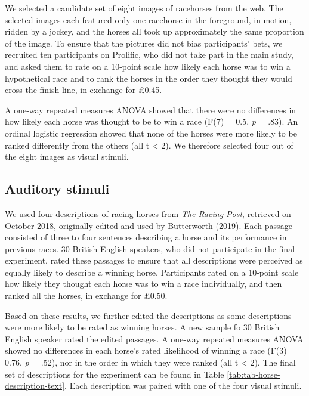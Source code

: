 \documentclass[
  man,floatsintext]{apa7}
\begin{document}
We selected a candidate set of eight images of racehorses from the web. The selected images each featured only one racehorse in the foreground, in motion, ridden by a jockey, and the horses all took up approximately the same proportion of the image. To ensure that the pictures did not bias participants' bets, we recruited ten participants on Prolific, who did not take part in the main study, and asked them to rate on a 10-point scale how likely each horse was to win a hypothetical race and to rank the horses in the order they thought they would cross the finish line, in exchange for £0.45.

A one-way repeated measures ANOVA showed that there were no differences in how likely each horse was thought to be to win a race (F(7) = 0.5, \emph{p} = .83). An ordinal logistic regression showed that none of the horses were more likely to be ranked differently from the others (all \textbar t\textbar{} \textless{} 2). We therefore selected four out of the eight images as visual stimuli.

\hypertarget{auditory-stimuli}{%
\subsection{Auditory stimuli}\label{auditory-stimuli}}

We used four descriptions of racing horses from \emph{The Racing Post}, retrieved on October 2018, originally edited and used by Butterworth (2019). Each passage consisted of three to four sentences describing a horse and its performance in previous races. 30 British English speakers, who did not participate in the final experiment, rated these passages to ensure that all descriptions were perceived as equally likely to describe a winning horse. Participants rated on a 10-point scale how likely they thought each horse was to win a race individually, and then ranked all the horses, in exchange for £0.50.

Based on these results, we further edited the descriptions as some descriptions were more likely to be rated as winning horses. A new sample fo 30 British English speaker rated the edited passages. A one-way repeated measures ANOVA showed no differences in each horse's rated likelihood of winning a race (F(3) = 0.76, \emph{p} = .52), nor in the order in which they were ranked (all \textbar t\textbar{} \textless{} 2). The final set of descriptions for the experiment can be found in Table \ref{tab:tab-horse-description-text}. Each description was paired with one of the four visual stimuli.
\end{document}
